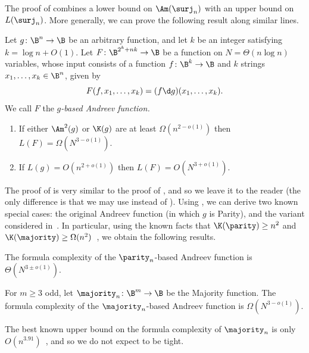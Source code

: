 The proof of  combines a lower bound on $\Am(\surj_{n})$
with an upper bound on $L(\surj_{n})$. More generally, we can prove
the following result along similar lines. 
\begin{theorem}
\label{thm:andreev-general}Let $g\colon\B^{n}\to\B$ be an arbitrary
function, and let $k$ be an integer satisfying $k=\log n+O(1)$.
Let $F\colon\B^{2^{k}+nk}\to\B$ be a function on $N=\Theta(n\log n)$
variables, whose input consists of a function $f\colon\B^{k}\to\B$
and $k$ strings $x_{1},\ldots,x_{k}\in\B^{n}$, given by 
\[
F(f,x_{1},\ldots,x_{k})=(f\d g)(x_{1},\ldots,x_{k}).
\]
We call $F$ the \emph{$g$-based Andreev function.} 
\begin{enumerate}
\item If either $\Am^{2}(g)$ or $\K(g)$ are at least $\Omega(n^{2-o(1)})$
then $L(F)=\Omega(N^{3-o(1)})$. 
\item If $L(g)=O(n^{2+o(1)})$ then $L(F)=O(N^{3+o(1)})$. 
\end{enumerate}
\end{theorem}

The proof of  is very similar to the proof
of , and so we leave it to the reader (the only difference
is that we may use  instead of ).
Using , we can derive two known special
cases: the original Andreev function (in which $g$ is Parity), and
the variant considered in~\cite{GTN19}. In particular, using the
known facts that $\K(\parity)\ge n^{2}$ and $\K(\majority)\ge\Omega(n^{2})$~\cite{K72},
we obtain the following results. 
\begin{corollary}
\label{cor:parity}The formula complexity of the $\parity_{n}$-based
Andreev function is $\Theta(N^{3\pm o(1)})$. 
\end{corollary}

\begin{corollary}
\label{cor:majority} For $m\geq3$ odd, let $\majority_{n}\colon\B^{m}\to\B$
be the Majority function. The formula complexity of the $\majority_{n}$-based
Andreev function is $\Omega(N^{3-o(1)})$. 
\end{corollary}

The best known upper bound on the formula complexity of $\majority_{n}$
is only $O(n^{3.91})$~\cite{S16}, and so we do not expect 
 to be tight.

%

